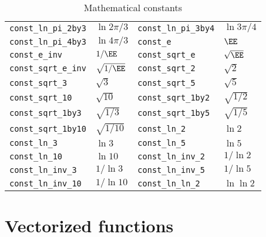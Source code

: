 \begin{table}
\begin{tabularx}{\textwidth}{p{1.5in}Lp{1.5in}L}
    \texttt{const\_ln\_pi\_2by3}   & $\ln{2\pi/3}$   &
    \texttt{const\_ln\_pi\_3by4}   & $\ln{3\pi/4}$   \\
    \texttt{const\_ln\_pi\_4by3}   & $\ln{4\pi/3}$   &
    \texttt{const\_e}              & $\EE$           \\
    \texttt{const\_e\_inv}         & $1/\EE$         &
    \texttt{const\_sqrt\_e}        & $\sqrt{\EE}$    \\
    \texttt{const\_sqrt\_e\_inv}   & $\sqrt{1/\EE}$  &
    \texttt{const\_sqrt\_2}        & $\sqrt{2}$      \\
    \texttt{const\_sqrt\_3}        & $\sqrt{3}$      &
    \texttt{const\_sqrt\_5}        & $\sqrt{5}$      \\
    \texttt{const\_sqrt\_10}       & $\sqrt{10}$     &
    \texttt{const\_sqrt\_1by2}     & $\sqrt{1/2}$    \\
    \texttt{const\_sqrt\_1by3}     & $\sqrt{1/3}$    &
    \texttt{const\_sqrt\_1by5}     & $\sqrt{1/5}$    \\
    \texttt{const\_sqrt\_1by10}    & $\sqrt{1/10}$   &
    \texttt{const\_ln\_2}          & $\ln{2}$        \\
    \texttt{const\_ln\_3}          & $\ln{3}$        &
    \texttt{const\_ln\_5}          & $\ln{5}$        \\
    \texttt{const\_ln\_10}         & $\ln{10}$       &
    \texttt{const\_ln\_inv\_2}     & $1/\ln{2}$      \\
    \texttt{const\_ln\_inv\_3}     & $1/\ln{3}$      &
    \texttt{const\_ln\_inv\_5}     & $1/\ln{5}$      \\
    \texttt{const\_ln\_inv\_10}    & $1/\ln{10}$     &
    \texttt{const\_ln\_ln\_2}      & $\ln\ln{2}$     \\
    \bottomrule
  \end{tabularx}
  \caption{Mathematical constants}
  \label{tab:Mathematical constants}
\end{table}

\clearpage

\section{Vectorized functions}
\label{sec:Vectorized functions}

